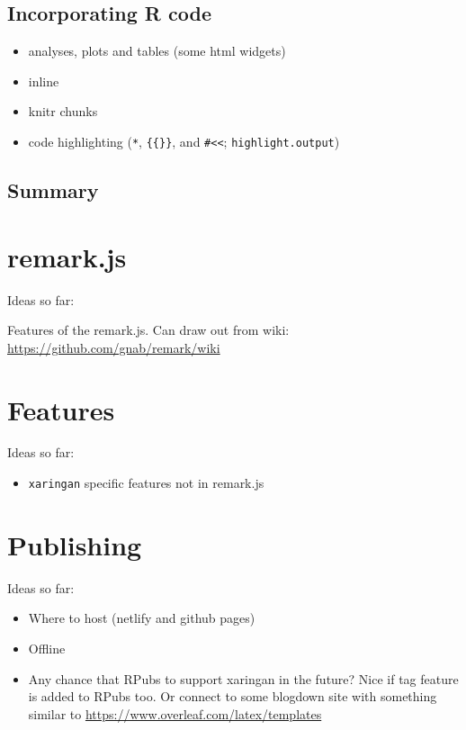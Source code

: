 \documentclass[
]{book}
\providecommand{\tightlist}{%
  \setlength{\itemsep}{0pt}\setlength{\parskip}{0pt}}
\begin{document}
\hypertarget{incorporating-r-code}{%
\section{Incorporating R code}\label{incorporating-r-code}}

\begin{itemize}
\tightlist
\item
  analyses, plots and tables (some html widgets)
\item
  inline
\item
  knitr chunks
\item
  code highlighting (\texttt{*}, \texttt{\{\{\}\}}, and \texttt{\#\textless{}\textless{}}; \texttt{highlight.output})
\end{itemize}

\hypertarget{summary}{%
\section{Summary}\label{summary}}

\hypertarget{remarkjs}{%
\chapter{remark.js}\label{remarkjs}}

Ideas so far:

Features of the remark.js. Can draw out from wiki: \url{https://github.com/gnab/remark/wiki}

\hypertarget{feature}{%
\chapter{Features}\label{feature}}

Ideas so far:

\begin{itemize}
\tightlist
\item
  \texttt{xaringan} specific features not in remark.js
\end{itemize}

\hypertarget{publishing}{%
\chapter{Publishing}\label{publishing}}

Ideas so far:

\begin{itemize}
\tightlist
\item
  Where to host (netlify and github pages)
\item
  Offline
\item
  Any chance that RPubs to support xaringan in the future? Nice if tag feature is added to RPubs too. Or connect to some blogdown site with something similar to \url{https://www.overleaf.com/latex/templates}
\end{itemize}
\end{document}
